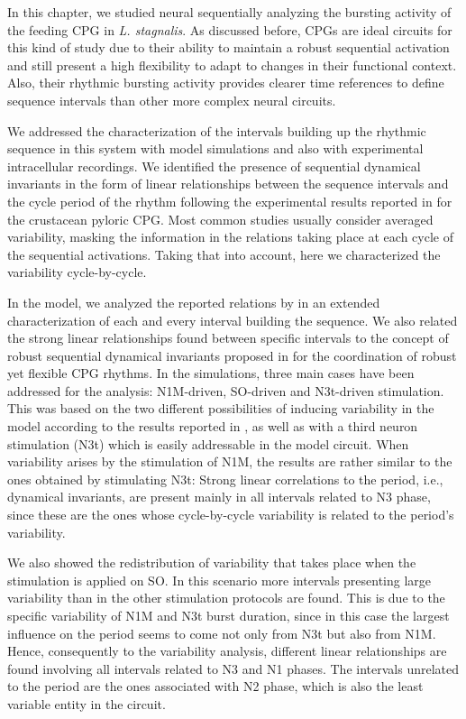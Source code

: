 In this chapter, we studied neural sequentially analyzing the bursting activity of the feeding CPG in \textit{L. stagnalis}. As discussed before, CPGs are ideal circuits for this kind of study due to their ability to maintain a robust sequential activation and still present a high flexibility to adapt to changes in their functional context. Also, their rhythmic bursting activity provides clearer time references to define sequence intervals than other more complex neural  circuits. 

We addressed the characterization of the intervals building up the rhythmic sequence in this system with model simulations and also with experimental intracellular recordings. We identified the presence of sequential dynamical invariants in the form of linear relationships between the sequence intervals and the cycle period of the rhythm following the experimental results reported in \textcite{elices_robust_2019} for the crustacean pyloric CPG. Most common studies usually consider averaged variability, masking the information in the relations taking place at each cycle of the sequential activations. Taking that into account, here we characterized the variability cycle-by-cycle. 

In the model, we analyzed the reported relations by \textcite{elliott_temporal_1991} in an extended characterization of each and every interval building the sequence. We also related the strong linear relationships found between specific intervals to the concept of robust sequential dynamical invariants proposed in \textcite{elices_robust_2019} for the coordination of robust yet flexible CPG rhythms. In the simulations, three main cases have been addressed for the analysis: N1M-driven, SO-driven and N3t-driven stimulation. This was based on the two different possibilities of inducing variability in the model according to the results reported in \textcite{vavoulis_dynamic_2007}, as well as with a third neuron stimulation (N3t) which is easily addressable in the model circuit. When variability arises by the stimulation of N1M, the results are rather similar to the ones obtained by stimulating N3t: Strong linear correlations to the period, i.e., dynamical invariants, are present mainly in all intervals related to N3 phase, since these are the ones whose cycle-by-cycle variability is related to the period's variability.  

We also showed the redistribution of variability that takes place when the stimulation is applied on SO. In this scenario more intervals presenting large variability than in the other stimulation protocols are found. This is due to the specific variability of N1M and N3t burst duration, since in this case the largest influence on the period seems to come not only from N3t but also from N1M. Hence, consequently to the variability analysis, different linear relationships are found involving all intervals related to N3 and N1 phases. The intervals unrelated to the period are the ones associated with N2 phase, which is also the least variable entity in the circuit. 

